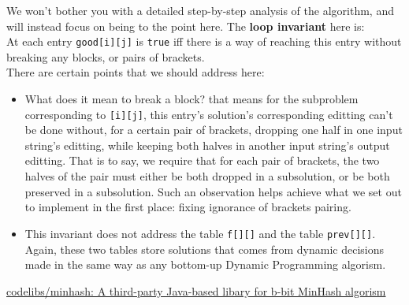 \documentclass{article}
\begin{document}
We won't bother you with a detailed step-by-step analysis of the algorithm, and will instead focus on being to the point here. The \textbf{loop invariant} here is:\\
At each entry \texttt{good[i][j]} is \texttt{true} iff there is a way of reaching this entry without breaking any blocks, or pairs of brackets.\\

There are certain points that we should address here:
\begin{itemize}
  \item What does it mean to break a block? that means for the subproblem corresponding to \texttt{[i][j]}, this entry's solution's corresponding editting can't be done without, for a certain pair of brackets, dropping one half in one input string's editting, while keeping both halves in another input string's output editting. That is to say, we require that for each pair of brackets, the two halves of the pair must either be both dropped in a subsolution, or be both preserved in a subsolution. Such an observation helps achieve what we set out to implement in the first place: fixing ignorance of brackets pairing.
  \item This invariant does not address the table \texttt{f[][]} and the table \texttt{prev[][]}. Again, these two tables store solutions that comes from dynamic decisions made in the same way as any bottom-up Dynamic Programming algorism. 
\end{itemize}








\begin{thebibliography}{9}
      \href{https://github.com/codelibs/minhash}{codelibs/minhash: A third-party Java-based libary  for b-bit MinHash algorism}


\end{thebibliography} %
\end{document}
